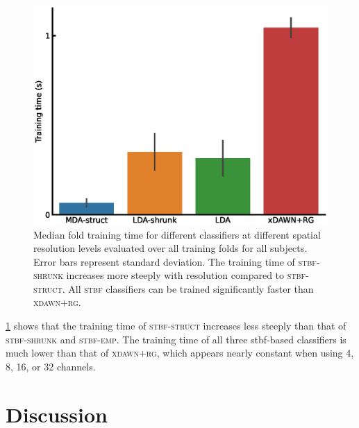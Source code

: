 	\begin{figure}
		\includegraphics[width=.66\linewidth]{figures/stbf_struct/training_time.eps}
    \caption[Classifier training time.]{Median fold training time for different classifiers at different spatial
			resolution levels evaluated over all training folds for all subjects.
			Error bars represent standard deviation. The training time of \textsc{stbf-shrunk} increases more
			steeply with resolution compared to \textsc{stbf-struct}.
			All \textsc{stbf} classifiers can be trained significantly faster than
			\textsc{xdawn+rg}.}
		\label{fig:stbf-struct/training-time}
	\end{figure}

	\cref{fig:stbf-struct/training-time} shows that the training time of
	\textsc{stbf-struct} increases less steeply than that of \textsc{stbf-shrunk}
	and \textsc{stbf-emp}. The training time of all three \ac{stbf}-based classifiers is
	much lower than that of \textsc{xdawn+rg}, which appears nearly constant when using
	4, 8, 16, or 32 channels.

	\section{Discussion}

